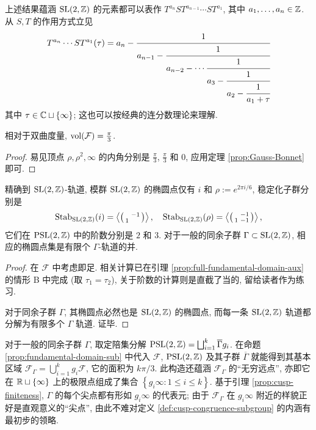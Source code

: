 上述结果蕴涵 $\operatorname{SL}(2,\mathbb{Z})$ 的元素都可以表作 $T^{a_n} S T^{a_{n-1}} \cdots ST^{a_1}$, 其中 $a_1, \ldots, a_n \in \mathbb{Z}$. 从 $S,T$ 的作用方式立见
\[ T^{a_n} \cdots ST^{a_1}(\tau) =
	a_n - \cfrac{1}{ a_{n-1} -
		\cfrac{1}{a_{n-2} - \cdots
			\cfrac{1}{a_3 -
				\cfrac{1}{a_2 - \cfrac{1}{a_1
					+ \tau}
				}
			}
		}
	}
\]
其中 $\tau \in \mathbb{C} \sqcup \{\infty\}$; 这也可以按经典的连分数理论来理解.

\begin{proposition}\label{prop:hyperbolic-volume}
	相对于双曲度量, $\operatorname{vol}(\mathcal{F}) = \frac{\pi}{3}$.
\end{proposition}
\begin{proof}
	易见顶点 $\rho, \rho^2, \infty$ 的内角分别是 $\frac{\pi}{3}$, $\frac{\pi}{3}$ 和 $0$, 应用定理 \ref{prop:Gauss-Bonnet} 即可.
\end{proof}

\begin{proposition}\label{prop:elliptic-pt-cyclic}
	精确到 $\operatorname{SL}(2,\mathbb{Z})$-轨道, 模群 $\operatorname{SL}(2,\mathbb{Z})$ 的椭圆点仅有 $i$ 和 $\rho := e^{2\pi i/6}$, 稳定化子群分别是
	\[ \operatorname{Stab}_{\operatorname{SL}(2,\mathbb{Z})}(i) = \left\langle  \bigl(\begin{smallmatrix}  & -1 \\ 1 &  \end{smallmatrix}\bigr)  \right\rangle, \quad \operatorname{Stab}_{\operatorname{SL}(2,\mathbb{Z})}(\rho) = \left\langle  \bigl(\begin{smallmatrix}  & -1 \\ 1 & -1 \end{smallmatrix}\bigr)  \right\rangle,  \]
	它们在 $\operatorname{PSL}(2,\mathbb{Z})$ 中的阶数分别是 $2$ 和 $3$. 对于一般的同余子群 $\Gamma \subset \operatorname{SL}(2,\mathbb{Z})$, 相应的椭圆点集是有限个 $\Gamma$-轨道的并.
\end{proposition}
\begin{proof}
	在 $\mathcal{F}$ 中考虑即足. 相关计算已在引理 \ref{prop:full-fundamental-domain-aux} 的情形 B 中完成 (取 $\tau_1 = \tau_2$), 关于阶数的计算则是直截了当的, 留给读者作为练习.
	
	对于同余子群 $\Gamma$, 其椭圆点必然也是 $\operatorname{SL}(2,\mathbb{Z})$ 的椭圆点, 而每一条 $\operatorname{SL}(2,\mathbb{Z})$ 轨道都分解为有限多个 $\Gamma$ 轨道. 证毕.
\end{proof}

对于一般的同余子群 $\Gamma$, 取定陪集分解 $\operatorname{PSL}(2,\mathbb{Z}) = \bigsqcup_{i=1}^k \overline{\Gamma} g_i$. 在命题 \ref{prop:fundamental-domain-sub} 中代入 $\mathcal{F}$, $\operatorname{PSL}(2,\mathbb{Z})$ 及其子群 $\overline{\Gamma}$ 就能得到其基本区域 $\mathcal{F}_\Gamma = \bigcup_{i=1}^k g_i\mathcal{F}$, 它的面积为 $k\pi/3$. 此构造还蕴涵 $\mathcal{F}_\Gamma$ 的``无穷远点'', 亦即它在 $\mathbb{R} \sqcup \{\infty\}$ 上的极限点组成了集合 $\left\{ g_i \infty : 1 \leq i \leq k \right\}$. 基于引理 \ref{prop:cusp-finiteness}, $\Gamma$ 的每个尖点都有形如 $g_i \infty$ 的代表元; 由于 $\mathcal{F}_\Gamma$ 在 $g_i \infty$ 附近的样貌正好是直观意义的``尖点'', 由此不难对定义 \ref{def:cusp-congruence-subgroup} 的内涵有最初步的领略.

